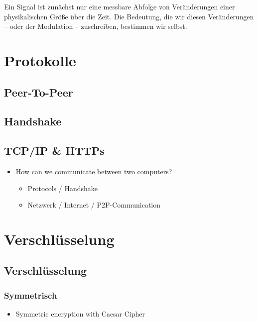 \documentclass[
  letterpaper,
  DIV=11]{scrreprt}
\providecommand{\tightlist}{%
  \setlength{\itemsep}{0pt}\setlength{\parskip}{0pt}}\usepackage{longtable,booktabs,array}
\begin{document}
Ein Signal ist zunächst nur eine messbare Abfolge von Veränderungen
einer physikalischen Größe über die Zeit. Die Bedeutung, die wir diesen
Veränderungen -- oder der Modulation -- zuschreiben, bestimmen wir
selbst.

\chapter{Protokolle}\label{protokolle}

\section{Peer-To-Peer}\label{peer-to-peer}

\section{Handshake}\label{handshake}

\section{TCP/IP \& HTTPs}\label{tcpip-https}

\begin{itemize}
\item
  How can we communicate between two computers?

  \begin{itemize}
  \item
    Protocols / Handshake
  \item
    Netzwerk / Internet / P2P-Communication
  \end{itemize}
\end{itemize}

\chapter{Verschlüsselung}\label{verschluxfcsselung}

\section{Verschlüsselung}\label{verschluxfcsselung-1}

\subsection{Symmetrisch}\label{symmetrisch}

\begin{itemize}
\tightlist
\item
  Symmetric encryption with Caesar Cipher
\end{itemize}
\end{document}
